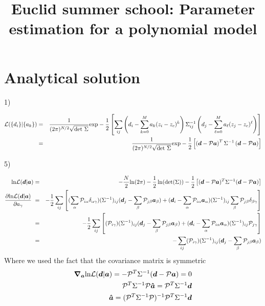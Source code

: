\documentclass[a4paper]{article}
\title{ Euclid summer school: Parameter estimation for a polynomial model}
\def\ba{\begin{eqnarray}}
\def\ea{\end{eqnarray}}
\begin{document}
\maketitle


\section{Analytical solution}

1) 

\ba
{\cal L}( \{d_{i} \} | \{a_{k} \}) &=& \frac{1}{(2\pi)^{N/2} \sqrt{\rm  det \ \Sigma} } {\rm exp}  - \frac{1}{2} \left[ \sum_{ij} \left( d_{i}  -\sum_{k=0}^{M} a_{k}  (z_{i}-z_{c})^{k} \right)    \Sigma_{ij}^{-1}  \left( d_{j}  -\sum_{\ell=0}^{M} a_{\ell}  (z_{j}-z_{c})^{\ell} \right)  \right]  \nonumber \\
&=& \frac{1}{(2\pi)^{N/2} \sqrt{\rm  det \ \Sigma} } {\rm exp}  - \frac{1}{2} \left[  \left( \bm{d} - {\cal P} \bm{a} \right)^{T}    \Sigma^{-1}  \left( \bm{d} - {\cal P} \bm{a} \right)  \right]
\ea

5)

\ba
{\rm ln}{\cal L}(\bm{d} | \bm{a}) &=& -\frac{N}{2} {\rm ln}(2\pi) - \frac{1}{2} \ln ({\rm det}( \Sigma)) -\frac{1}{2} \left[ ( \bm{d} - {\cal P}\bm{a})^{T} \Sigma^{-1}   ( \bm{d} - {\cal P}\bm{a})\right]  \nonumber \\
\frac{\partial{\rm ln}{\cal L}(\bm{d} | \bm{a})}{\partial a_{\gamma}}  &=&   - \frac{1}{2} \sum_{ij} \left[ (  \sum_{\alpha}{\cal P}_{i\alpha}\delta_{\alpha\gamma}) (\Sigma^{-1})_{ij}   ( \bm{d}_{j} - \sum_{\beta}{\cal P}_{j\beta}\bm{a}_{\beta}) + ( \bm{d}_{i} - \sum_{\alpha}{\cal P}_{i\alpha}\bm{a}_{\alpha}) (\Sigma^{-1})_{ij}  \sum_{\beta}{\cal P}_{j\beta} \delta_{\beta\gamma} \right]   \nonumber \nonumber \\
&=&   - \frac{1}{2} \sum_{ij} \left[ (  {\cal P}_{i\gamma}) (\Sigma^{-1})_{ij}   ( \bm{d}_{j} - \sum_{\beta}{\cal P}_{j\beta}\bm{a}_{\beta}) + ( \bm{d}_{i} - \sum_{\alpha}{\cal P}_{i\alpha}\bm{a}_{\alpha}) (\Sigma^{-1})_{ij}  {\cal P}_{j\gamma} \right]   \nonumber \\
&=&  -  \sum_{ij}  (  {\cal P}_{i\gamma}) (\Sigma^{-1})_{ij}   ( \bm{d}_{j} - \sum_{\beta}{\cal P}_{j\beta}\bm{a}_{\beta})  
\ea
Where we used  the fact that the covariance matrix is symmetric
\ba
\bm{\nabla}_{\bm{a}} {\rm ln}{\cal L}(\bm{d} | \bm{a}) = - {\cal P}^{T}  \Sigma^{-1}( \bm{d} - {\cal P}\bm{a}) = 0   \\
 {\cal P}^{T}  \Sigma^{-1}{\cal P}\bm{\hat{a}} = {\cal P}^{T}  \Sigma^{-1} \bm{d} \nonumber  \\
    \bm{\hat{a}} = ( {\cal P}^{T}  \Sigma^{-1}{\cal P})^{-1}{\cal P}^{T}  \Sigma^{-1} \bm{d} 
\ea
\end{document}
